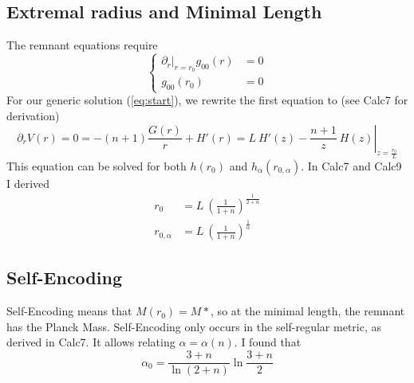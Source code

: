 \documentclass[10pt,a4paper, fleqn]{article}
\begin{document}
\subsection{Extremal radius and Minimal Length}
The remnant equations require
%
\begin{equation}
\begin{cases}
  \left. \partial_r \right|_{r=r_0} g_{00}(r) &= 0 \\
  g_{00}(r_0) &= 0
\end{cases}
\end{equation}
%
For our generic solution (\ref{eq:start}), we rewrite the first equation to (see Calc7 for derivation)
%
\begin{equation}
\partial_r V(r) = 0
    = -(n+1) \frac{G(r)}{r} + H'(r)
    = \left.L~H'(z)  -\frac{n+1}z~H(z)  \right|_{z=\frac{r_0} L}
\end{equation}
%
This equation can be solved for both $h(r_0)$ and $h_\alpha(r_{0,\alpha})$. In Calc7 and Calc9 I derived
%
\begin{subequations}
\begin{align}
r_0 &= L~\left( \frac 1{1+n} \right)^{\frac 1{2+n}}
 \label{eq:r0holo}\\
r_{0,\alpha} &= L~\left( \frac 1{1+n} \right)^{\frac 1\alpha}
\label{eq:r0alpha}
\end{align}
\end{subequations}

\subsection{Self-Encoding}
Self-Encoding means that $M(r_0) = M*$, so at the minimal length, the remnant has the Planck Mass. Self-Encoding only occurs in the self-regular metric, as derived in Calc7. It allows relating $\alpha = \alpha(n)$. I found that
%
\begin{equation}
\alpha_0 = \frac {3+n}{\ln(2+n)} \ln \frac {3+n}2
\end{equation}
%
\end{document}
